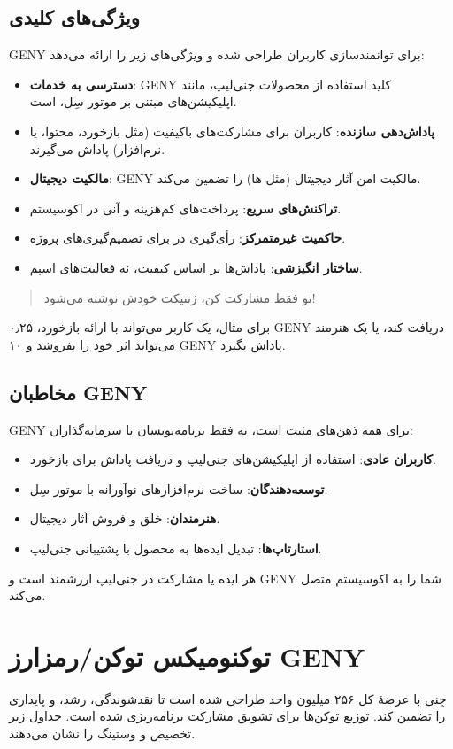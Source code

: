 \documentclass[a4paper,12pt,openany]{book}
\begin{document}
\subsection*{ویژگی‌های کلیدی}
GENY برای توانمندسازی کاربران طراحی شده و ویژگی‌های زیر را ارائه می‌دهد:
\begin{itemize}
    \item \textbf{دسترسی به خدمات}: GENY کلید استفاده از محصولات جنی‌لیپ، مانند اپلیکیشن‌های مبتنی بر موتور سِل، است.
    \item \textbf{پاداش‌دهی سازنده}: کاربران برای مشارکت‌های باکیفیت (مثل بازخورد، محتوا، یا نرم‌افزار) پاداش می‌گیرند.
    \item \textbf{مالکیت دیجیتال}: GENY مالکیت امن آثار دیجیتال (مثل ها) را تضمین می‌کند.
    \item \textbf{تراکنش‌های سریع}: پرداخت‌های کم‌هزینه و آنی در اکوسیستم.
    \item \textbf{حاکمیت غیرمتمرکز}: رأی‌گیری در  برای تصمیم‌گیری‌های پروژه.
    \item \textbf{ساختار انگیزشی}: پاداش‌ها بر اساس کیفیت، نه فعالیت‌های اسپم.
\end{itemize}
\begin{quote}
تو فقط مشارکت کن، ژنتیکت خودش نوشته می‌شود!
\end{quote}
برای مثال، یک کاربر می‌تواند با ارائه بازخورد، ۰٫۲۵ GENY دریافت کند، یا یک هنرمند می‌تواند اثر  خود را بفروشد و ۱۰ GENY پاداش بگیرد.

\subsection*{مخاطبان GENY}
GENY برای همه ذهن‌های مثبت است، نه فقط برنامه‌نویسان یا سرمایه‌گذاران:
\begin{itemize}
    \item \textbf{کاربران عادی}: استفاده از اپلیکیشن‌های جنی‌لیپ و دریافت پاداش برای بازخورد.
    \item \textbf{توسعه‌دهندگان}: ساخت نرم‌افزارهای نوآورانه با موتور سِل.
    \item \textbf{هنرمندان}: خلق و فروش آثار دیجیتال.
    \item \textbf{استارتاپ‌ها}: تبدیل ایده‌ها به محصول با پشتیبانی جنی‌لیپ.
\end{itemize}
هر ایده یا مشارکت در جنی‌لیپ ارزشمند است و GENY شما را به اکوسیستم متصل می‌کند.
\newpage

\section*{توکنومیکس توکن/رمزارز GENY}
جِنی با عرضهٔ کل ۲۵۶ میلیون واحد طراحی شده است تا نقد‌شوندگی، رشد، و پایداری را تضمین کند. توزیع توکن‌ها برای تشویق مشارکت برنامه‌ریزی شده است. جداول زیر تخصیص و وستینگ را نشان می‌دهند.
\end{document}
